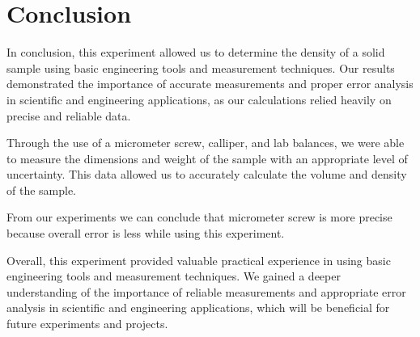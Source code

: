 \section{Conclusion}

In conclusion, this experiment allowed us to determine the density of a solid sample using basic engineering tools and measurement techniques. Our results demonstrated the importance of accurate measurements and proper error analysis in scientific and engineering applications, as our calculations relied heavily on precise and reliable data. 

Through the use of a micrometer screw, calliper, and lab balances, we were able to measure the dimensions and weight of the sample with an appropriate level of uncertainty. This data allowed us to accurately calculate the volume and density of the sample. 

From our experiments we can conclude that micrometer screw is more precise because overall error is less while using this experiment.

Overall, this experiment provided valuable practical experience in using basic engineering tools and measurement techniques. We gained a deeper understanding of the importance of reliable measurements and appropriate error analysis in scientific and engineering applications, which will be beneficial for future experiments and projects. 